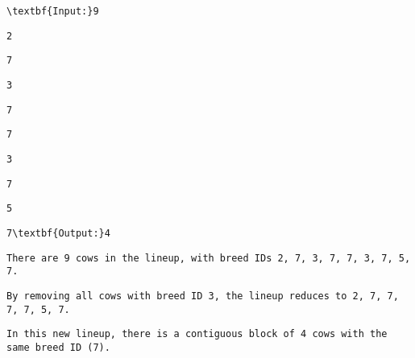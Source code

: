 \begin{verbatim}
\textbf{Input:}9 \end{verbatim}
\begin{verbatim}
2 \end{verbatim}
\begin{verbatim}
7 \end{verbatim}
\begin{verbatim}
3 \end{verbatim}
\begin{verbatim}
7 \end{verbatim}
\begin{verbatim}
7 \end{verbatim}
\begin{verbatim}
3 \end{verbatim}
\begin{verbatim}
7 \end{verbatim}
\begin{verbatim}
5 \end{verbatim}
\begin{verbatim}
7\textbf{Output:}4\end{verbatim}
\begin{verbatim}
There are 9 cows in the lineup, with breed IDs 2, 7, 3, 7, 7, 3, 7, 5, 7.\end{verbatim}
\begin{verbatim}
By removing all cows with breed ID 3, the lineup reduces to 2, 7, 7, 7, 7, 5, 7.  \end{verbatim}
\begin{verbatim}
In this new lineup, there is a contiguous block of 4 cows with the same breed ID (7).\end{verbatim}